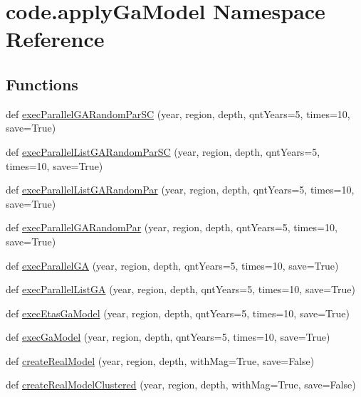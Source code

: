 \hypertarget{namespacecode_1_1apply_ga_model}{}\section{code.\+apply\+Ga\+Model Namespace Reference}
\label{namespacecode_1_1apply_ga_model}
\subsection*{Functions}
\begin{DoxyCompactItemize}
\item 
def \hyperlink{namespacecode_1_1apply_ga_model_a38183cdd99189106a38c3781c3157055}{exec\+Parallel\+G\+A\+Random\+Par\+SC} (year, region, depth, qnt\+Years=5, times=10, save=True)
\item 
def \hyperlink{namespacecode_1_1apply_ga_model_aed9039f3ef73e2b718ae62a0e2e40b0e}{exec\+Parallel\+List\+G\+A\+Random\+Par\+SC} (year, region, depth, qnt\+Years=5, times=10, save=True)
\item 
def \hyperlink{namespacecode_1_1apply_ga_model_a03f8861e04a11502b257aca2939c80c9}{exec\+Parallel\+List\+G\+A\+Random\+Par} (year, region, depth, qnt\+Years=5, times=10, save=True)
\item 
def \hyperlink{namespacecode_1_1apply_ga_model_abf58483d7e74e0d52aec7d2900fc2613}{exec\+Parallel\+G\+A\+Random\+Par} (year, region, depth, qnt\+Years=5, times=10, save=True)
\item 
def \hyperlink{namespacecode_1_1apply_ga_model_aacaeaf4ff25c96c329dde161b3463600}{exec\+Parallel\+GA} (year, region, depth, qnt\+Years=5, times=10, save=True)
\item 
def \hyperlink{namespacecode_1_1apply_ga_model_abd22820f394722a6bb41b706dbe25a3e}{exec\+Parallel\+List\+GA} (year, region, depth, qnt\+Years=5, times=10, save=True)
\item 
def \hyperlink{namespacecode_1_1apply_ga_model_a8c8aeb9d71e52b5801385c7d463a5c9c}{exec\+Etas\+Ga\+Model} (year, region, depth, qnt\+Years=5, times=10, save=True)
\item 
def \hyperlink{namespacecode_1_1apply_ga_model_a6b97d26a1e7939bb1cc4a2714e536150}{exec\+Ga\+Model} (year, region, depth, qnt\+Years=5, times=10, save=True)
\item 
def \hyperlink{namespacecode_1_1apply_ga_model_a25291bb4b244e8aca5f2d0d62a730f4e}{create\+Real\+Model} (year, region, depth, with\+Mag=True, save=False)
\item 
def \hyperlink{namespacecode_1_1apply_ga_model_aecf1ec64a012bf27f9d3acd65b991e3a}{create\+Real\+Model\+Clustered} (year, region, depth, with\+Mag=True, save=False)

\end{DoxyCompactItemize}

